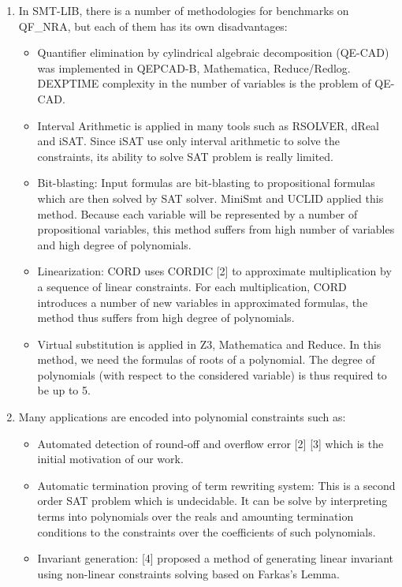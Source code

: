 \documentclass[12pt]{article}
\begin{document}
\begin{enumerate}
\item In SMT-LIB, there is a number of methodologies for benchmarks on QF\_NRA, but each of them has its own disadvantages:
\begin{itemize}
\item Quantifier elimination by cylindrical algebraic decomposition (QE-CAD) was implemented in QEPCAD-B, Mathematica, Reduce/Redlog. DEXPTIME complexity in the number of variables is the problem of QE-CAD. 
\item Interval Arithmetic is applied in many tools such as RSOLVER, dReal and iSAT. Since iSAT use only interval arithmetic to solve the constraints, its ability to solve SAT problem is really limited.
\item Bit-blasting: Input formulas are bit-blasting to propositional formulas which are then solved by SAT solver. MiniSmt and UCLID applied this method. Because each variable will be represented by a number of propositional variables, this method suffers from high number of variables and high degree of polynomials.
\item Linearization: CORD uses CORDIC [2] to approximate multiplication by a sequence of linear constraints. For each multiplication, CORD introduces a number of new variables in approximated formulas, the method thus suffers from high degree of polynomials.
\item Virtual substitution is applied in Z3, Mathematica and Reduce. In this method, we need the formulas of roots of a polynomial. The degree of polynomials (with respect to the considered variable) is thus required to be up to 5.
\end{itemize}
\item Many applications are encoded into polynomial constraints such as:
\begin{itemize}
\item Automated detection of round-off and overflow error [2] [3] which is the initial motivation of our work. 
\item Automatic termination proving of term rewriting system: This is a second order SAT problem which is undecidable. It can be solve by interpreting terms into polynomials over the reals and amounting termination conditions to the constraints over the coefficients of such polynomials.
\item Invariant generation: [4] proposed a method of generating linear invariant using non-linear constraints solving based on Farkas’s Lemma.
\end{itemize}
\end{enumerate}
\end{document}
